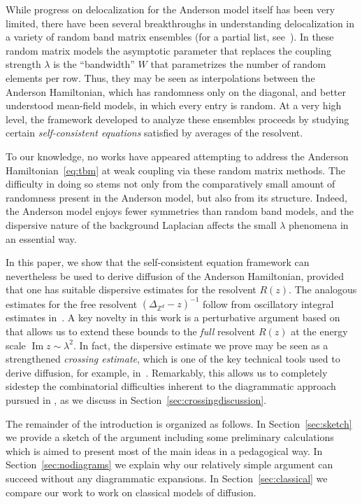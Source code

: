 \documentclass[11pt]{amsart}
\def\Z{{\mathbb{Z}}}
\newcommand{\Impt}{\operatorname*{Im}}
\numberwithin{equation}{section}
\numberwithin{theorem}{section}
\begin{document}
While progress on delocalization for the Anderson model itself has been very limited, there have been several breakthroughs in understanding delocalization in a variety of random band matrix ensembles
(for a partial list, see~\cite{bourgade2019random, bourgade2020random, yang2021random, yang2021delocalization,yang2022delocalization,yang2025delocalization,dubova2025delocalization}).
In these random matrix models the asymptotic parameter that replaces the coupling strength $\lambda$ is the ``bandwidth'' $W$ that parametrizes the number of random elements per row.
Thus, they may be seen as interpolations between the Anderson Hamiltonian, which has randomness only on the diagonal, and better understood mean-field models, in which every entry is random.
At a very high level, the framework developed to analyze these ensembles proceeds by studying certain \emph{self-consistent equations} satisfied by averages of the resolvent.

To our knowledge, no works have appeared attempting to address the Anderson Hamiltonian~\eqref{eq:tbm} at weak coupling via these random matrix methods.  The difficulty in doing so stems not only from the comparatively small amount of randomness present in the Anderson model, but also from its structure. Indeed, the Anderson model enjoys fewer symmetries than random band models, and the dispersive nature of the background Laplacian affects the small $\lambda$ phenomena in an essential way.

In this paper, we show that the self-consistent equation framework can nevertheless be used to derive diffusion of the Anderson Hamiltonian, provided that one has suitable dispersive estimates for the resolvent $R(z)$.
The analogous estimates for the free resolvent $(\Delta_{\Z^d}-z)^{-1}$ follow from oscillatory integral estimates in~\cite{ErdosSalmhofer,Taira,CueninSchippa}.
A key novelty in this work is a perturbative argument based on~\cite{BDH} that allows us to extend these bounds to the \emph{full} resolvent $R(z)$ at the energy scale $\Impt z\sim \lambda^2$.
In fact, the dispersive estimate we prove may be seen as a strengthened \emph{crossing estimate}, which is one of the key technical tools used to derive diffusion, for example, in~\cite{ESYAnderson}.
Remarkably, this allows us to completely sidestep the combinatorial difficulties inherent to the diagrammatic approach pursued in \cite{ESYAnderson,hernandez2024quantum}, as we discuss in Section~\ref{sec:crossingdiscussion}.

The remainder of the introduction is organized as follows.  In Section~\ref{sec:sketch} we provide a sketch of the argument including some preliminary calculations which is aimed to present most of the main ideas in a pedagogical way.  In Section~\ref{sec:nodiagrams} we explain why our relatively simple argument can succeed without any diagrammatic expansions.  In Section~\ref{sec:classical} we
compare our work to work on classical models of diffusion.
\end{document}
